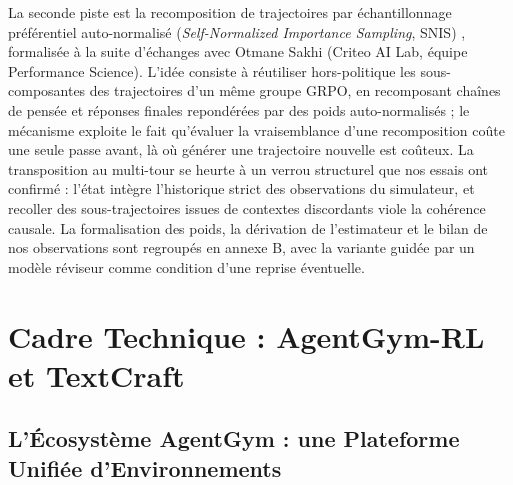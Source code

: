 \documentclass[11pt,a4paper]{article}
\begin{document}
La seconde piste est la recomposition de trajectoires par échantillonnage préférentiel auto-normalisé (\emph{Self-Normalized Importance Sampling}, SNIS) \cite[chap.~9]{owen2013montecarlo}, formalisée à la suite d'échanges avec Otmane Sakhi (Criteo AI Lab, équipe Performance Science). L'idée consiste à réutiliser hors-politique les sous-composantes des trajectoires d'un même groupe GRPO, en recomposant chaînes de pensée et réponses finales repondérées par des poids auto-normalisés ; le mécanisme exploite le fait qu'évaluer la vraisemblance d'une recomposition coûte une seule passe avant, là où générer une trajectoire nouvelle est coûteux. La transposition au multi-tour se heurte à un verrou structurel que nos essais ont confirmé : l'état intègre l'historique strict des observations du simulateur, et recoller des sous-trajectoires issues de contextes discordants viole la cohérence causale. La formalisation des poids, la dérivation de l'estimateur et le bilan de nos observations sont regroupés en annexe B, avec la variante guidée par un modèle réviseur comme condition d'une reprise éventuelle.



















\newpage
\section{Cadre Technique : AgentGym-RL et TextCraft}


\subsection{L'Écosystème AgentGym : une Plateforme Unifiée d'Environnements}
\end{document}
